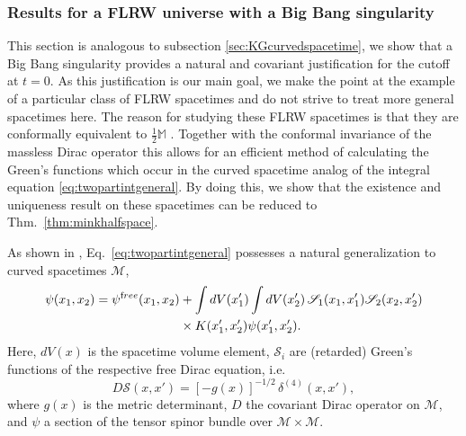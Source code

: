 \documentclass[b5paper,draft,openbib,12pt]{memoir}
\newcommand{\M}{\mathbb{M}}
\newcommand{\free}{{\textup free}}
\begin{document}
\subsubsection{Results for a FLRW universe with a Big Bang singularity} \label{sec:flrw}
This section is analogous to subsection \ref{sec:KGcurvedspacetime},
we show that a Big Bang singularity provides a 
natural and covariant justification for the cutoff at $t = 0$. As 
this justification is our main goal, we make the point at the 
example of a particular class of  
FLRW spacetimes and do not strive to treat more general spacetimes 
here. The reason for studying these FLRW spacetimes is that they are 
conformally equivalent to $\frac{1}{2} \M$ \cite{ibison}. Together 
with the conformal invariance of the massless Dirac operator this 
allows for an efficient method of calculating the Green's functions 
which occur in the curved spacetime analog of the integral equation 
\eqref{eq:twopartintgeneral}. By doing this, we show that the existence and 
uniqueness result on these spacetimes can be reduced to Thm.\ 
\ref{thm:minkhalfspace}.

As shown in \cite{lienertcurved}, Eq.\ \eqref{eq:twopartintgeneral} possesses 
a natural generalization to curved spacetimes $\mathcal{M}$,
\begin{align}\nonumber
  \psi(x_1,x_2) = \psi^\free(x_1,x_2) &+ \int dV(x_1') \int dV(x_2') \, \mathscr{S}_1(x_1,x_1') \mathscr{S}_2(x_2,x_2')\\
  &\times K(x_1',x_2') \psi(x_1',x_2').
	\label{eq:inteqcurved}
\end{align}
Here, $dV(x)$ is the spacetime volume element, $\mathscr{S}_i$ are (retarded) 
Green's functions of the respective free Dirac equation, i.e.\
\begin{equation}
	D \mathscr{S}(x,x') = [-g(x)]^{-1/2} \, \delta^{(4)}(x,x'),
	\label{eq:greensfndefcurved}
\end{equation}
where $g(x)$ is the metric determinant, $D$ the covariant Dirac 
operator on $\mathcal{M}$, and $\psi$ a section of the tensor 
spinor bundle over $\mathcal{M} \times \mathcal{M}$.
\end{document}
